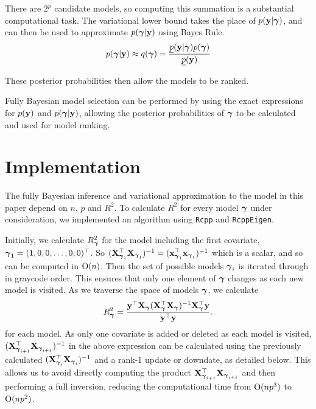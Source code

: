 \documentclass{amsart}[12pt]
\begin{document}
\noindent There are $2^p$ candidate models, so computing this summation is a substantial computational task. The
variational lower bound takes the place of $p({\bf y}|{\boldsymbol \gamma})$, and can then be used to approximate
$p({\boldsymbol \gamma}|{\bf y})$ using Bayes Rule.
$$p({\boldsymbol \gamma}|{\bf y}) \approx q({\boldsymbol \gamma}) = \frac{\underline{p}({\bf y}|{\boldsymbol \gamma}) p({\boldsymbol \gamma})}{\underline{p}({\bf y})}$$

\noindent These posterior probabilities then allow the models to be ranked.

Fully Bayesian model selection can be performed by using the exact expressions for $p({\bf y})$ and $p({\boldsymbol \gamma}|{\bf y})$, allowing the posterior probabilities of ${\boldsymbol \gamma}$ to be calculated and used for model ranking.

\section{Implementation}
\label{sec:implementation}


The fully Bayesian inference and variational approximation to the model in this paper depend on $n$, $p$ and
$R^2$. To calculate $R^2$ for every model ${\boldsymbol \gamma}$ under consideration, we implemented an algorithm using
\texttt{Rcpp} and \texttt{RcppEigen}.

Initially, we calculate $R^2_{\boldsymbol \gamma}$ for the model including the first covariate, ${\boldsymbol \gamma}_1 = (1, 0, 0,
\ldots, 0, 0)^\top$. So $({\bf X}_{{\boldsymbol \gamma}_1}^\top {\bf X}_{{\boldsymbol \gamma}_1})^{-1} = ({\bf x}_{{\boldsymbol \gamma}_1}^\top
{\bf x}_{{\boldsymbol \gamma}_1})^{-1}$ which is a scalar, and so can be computed in $\text{O}(n)$. Then the set of possible
models ${\boldsymbol \gamma}_i$ is iterated through in graycode order. This ensures that only one element of ${\boldsymbol \gamma}$
changes as each new model is visited. As we traverse the space of models ${\boldsymbol \gamma}$, we calculate
\[
	R^2_{\boldsymbol \gamma} = \frac{{\bf y}^\top {\bf X}_{\boldsymbol \gamma} ({\bf X}_{\boldsymbol \gamma}^\top {\bf X}_{\boldsymbol \gamma})^{-1} {\bf X}_{\boldsymbol \gamma}^\top {\bf y}}{{\bf y}^\top {\bf y}}.
\]
for each model. As only one covariate is added or deleted as each model is visited, $({\bf X}_{{\boldsymbol \gamma}_{i+1}}^\top
{\bf X}_{{\boldsymbol \gamma}_{i+1}})^{-1}$ in the above expression can be calculated using the previously calculated
$({\bf X}_{{\boldsymbol \gamma}_i}^\top {\bf X}_{{\boldsymbol \gamma}_i})^{-1}$ and a rank-1 update or downdate, as detailed below. This allows
us to avoid directly computing the product ${\bf X}_{{\boldsymbol \gamma}_{i+1}}^\top {\bf X}_{{\boldsymbol \gamma}_{i+1}}$ and then performing
a full inversion, reducing the computational time from $\text{O}(n p^3)$  to $\text{O}(n p^2)$.
\end{document}
